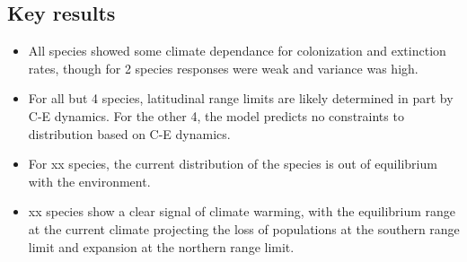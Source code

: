 \documentclass[11pt]{article}
\begin{document}
\subsection*{Key results}
\begin{itemize}
	\item All species showed some climate dependance for colonization and extinction rates, though for 2 species responses were weak and variance was high.
	\item For all but 4 species, latitudinal range limits are likely determined in part by C-E dynamics. For the other 4, the model predicts no constraints to distribution based on C-E dynamics.
	\item For xx species, the current distribution of the species is out of equilibrium with the environment.
	\item xx species show a clear signal of climate warming, with the equilibrium range at the current climate projecting the loss of populations at the southern range limit and expansion at the northern range limit.
\end{itemize}

%
\end{document}
